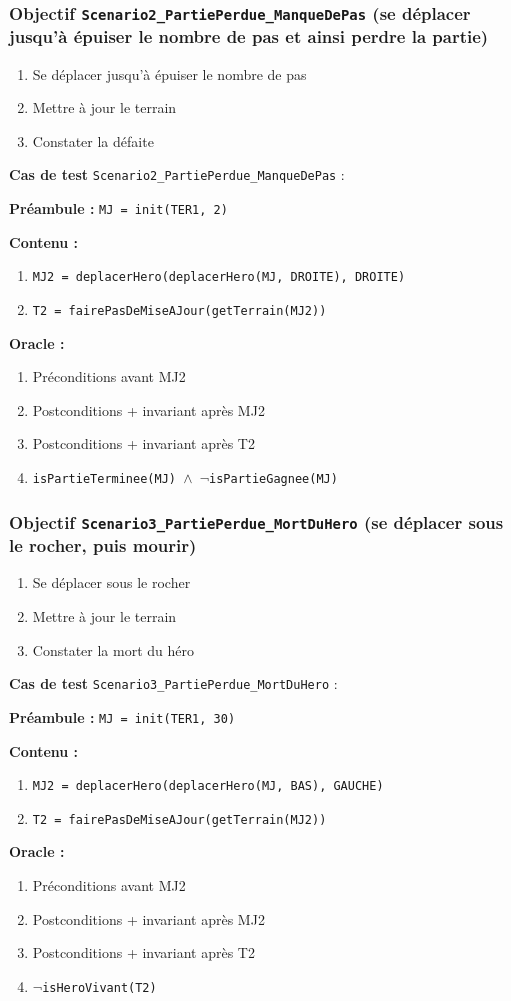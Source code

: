 \documentclass{article}
\newcommand{\cmd}[1]{\texttt{#1}}
\newcommand{\lAND}{$\land$}
\newcommand{\lNOT}{$\lnot$}
\newcommand{\obj}[2]{\subsubsection*{\large{\textbf{Objectif {\cmd{#1} (#2)}}}}}
\newenvironment{cas}[1]
{
	\hspace{1em}\textbf{Cas de test} \cmd{#1} :
	\begin{list}{}{}
}{
	\end{list}\vspace{1em}
}
\newcommand{\pre}[1]{\item \textbf{Préambule :} \cmd{#1}}
\newcommand{\oram}{\item \textbf{Oracle :}}
\newcommand{\opem}{\item \textbf{Contenu :}}
\begin{document}
\obj{Scenario2\_PartiePerdue\_ManqueDePas} {se déplacer jusqu'à épuiser le nombre de pas et ainsi perdre la partie}

	\begin{enumerate}
		\item Se déplacer jusqu'à épuiser le nombre de pas
		\item Mettre à jour le terrain
		\item Constater la défaite
	\end{enumerate}

	\begin{cas} {Scenario2\_PartiePerdue\_ManqueDePas}
		\pre{MJ = init(TER1, 2)}
		\opem{}
		\begin{enumerate}
			\item \cmd{MJ2 = deplacerHero(deplacerHero(MJ, DROITE), DROITE)}
			\item \cmd{T2 = fairePasDeMiseAJour(getTerrain(MJ2))}
		\end{enumerate}
		\oram{}
		\begin{enumerate}
			\item Préconditions avant MJ2
			\item Postconditions + invariant après MJ2
			\item Postconditions + invariant après T2
			\item \cmd{isPartieTerminee(MJ) \lAND{} \lNOT{}isPartieGagnee(MJ)}
		\end{enumerate}
	\end{cas}

\obj{Scenario3\_PartiePerdue\_MortDuHero} {se déplacer sous le rocher, puis mourir}

	\begin{enumerate}
		\item Se déplacer sous le rocher
		\item Mettre à jour le terrain
		\item Constater la mort du héro
	\end{enumerate}

	\begin{cas} {Scenario3\_PartiePerdue\_MortDuHero}
		\pre{MJ = init(TER1, 30)}
		\opem{}
		\begin{enumerate}
			\item \cmd{MJ2 = deplacerHero(deplacerHero(MJ, BAS), GAUCHE)}
			\item \cmd{T2 = fairePasDeMiseAJour(getTerrain(MJ2))}
		\end{enumerate}
		\oram{}
		\begin{enumerate}
			\item Préconditions avant MJ2
			\item Postconditions + invariant après MJ2
			\item Postconditions + invariant après T2
			\item \cmd{\lNOT{}isHeroVivant(T2)}
		\end{enumerate}
	\end{cas}
\end{document}
